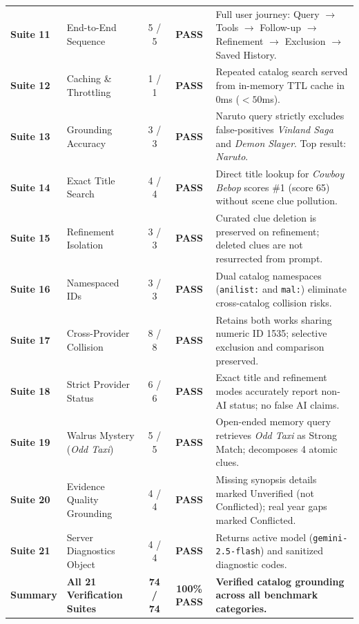 \documentclass[11pt,a4paper]{article}
\begin{document}
\begin{table}[htbp]
\begin{tabular}{@{}llccp{5.5cm}@{}}
\textbf{Suite 11} & End-to-End Sequence & 5 / 5 & \textbf{PASS} & Full user journey: Query $\to$ Tools $\to$ Follow-up $\to$ Refinement $\to$ Exclusion $\to$ Saved History. \\
\textbf{Suite 12} & Caching \& Throttling & 1 / 1 & \textbf{PASS} & Repeated catalog search served from in-memory TTL cache in 0ms ($< 50$ms). \\
\textbf{Suite 13} & Grounding Accuracy & 3 / 3 & \textbf{PASS} & Naruto query strictly excludes false-positives \textit{Vinland Saga} and \textit{Demon Slayer}. Top result: \textit{Naruto}. \\
\textbf{Suite 14} & Exact Title Search & 4 / 4 & \textbf{PASS} & Direct title lookup for \textit{Cowboy Bebop} scores \#1 (score 65) without scene clue pollution. \\
\textbf{Suite 15} & Refinement Isolation & 3 / 3 & \textbf{PASS} & Curated clue deletion is preserved on refinement; deleted clues are not resurrected from prompt. \\
\textbf{Suite 16} & Namespaced IDs & 3 / 3 & \textbf{PASS} & Dual catalog namespaces (\texttt{anilist:} and \texttt{mal:}) eliminate cross-catalog collision risks. \\
\textbf{Suite 17} & Cross-Provider Collision & 8 / 8 & \textbf{PASS} & Retains both works sharing numeric ID 1535; selective exclusion and comparison preserved. \\
\textbf{Suite 18} & Strict Provider Status & 6 / 6 & \textbf{PASS} & Exact title and refinement modes accurately report non-AI status; no false AI claims. \\
\textbf{Suite 19} & Walrus Mystery (\textit{Odd Taxi}) & 5 / 5 & \textbf{PASS} & Open-ended memory query retrieves \textit{Odd Taxi} as Strong Match; decomposes 4 atomic clues. \\
\textbf{Suite 20} & Evidence Quality Grounding & 4 / 4 & \textbf{PASS} & Missing synopsis details marked Unverified (not Conflicted); real year gaps marked Conflicted. \\
\textbf{Suite 21} & Server Diagnostics Object & 4 / 4 & \textbf{PASS} & Returns active model (\texttt{gemini-2.5-flash}) and sanitized diagnostic codes. \\
\midrule
\textbf{Summary} & \textbf{All 21 Verification Suites} & \textbf{74 / 74} & \textbf{100\% PASS} & \textbf{Verified catalog grounding across all benchmark categories.} \\
\bottomrule
\end{tabular}
\end{table}
\end{document}
